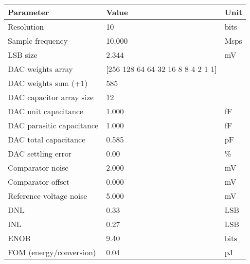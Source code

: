 \begin{tabular}{lll}
\toprule
Parameter & Value & Unit \\
\midrule
Resolution & 10 & bits \\
Sample frequency & 10.000 & Msps \\
LSB size & 2.344 & mV \\
DAC weights array & [256 128  64  64  32  16   8   8   4   2   1   1] &  \\
DAC weights sum (+1) & 585 &  \\
DAC capacitor array size & 12 &  \\
DAC unit capacitance & 1.000 & fF \\
DAC parasitic capacitance & 1.000 & fF \\
DAC total capacitance & 0.585 & pF \\
DAC settling error & 0.00 & \% \\
Comparator noise & 2.000 & mV \\
Comparator offset & 0.000 & mV \\
Reference voltage noise & 5.000 & mV \\
DNL & 0.33 & LSB \\
INL & 0.27 & LSB \\
ENOB & 9.40 & bits \\
FOM (energy/conversion) & 0.04 & pJ \\
\bottomrule
\end{tabular}
